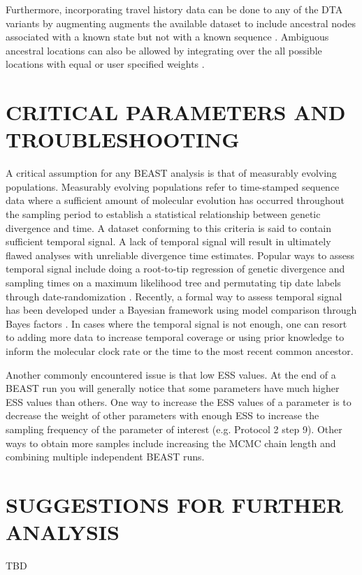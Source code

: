 \documentclass{article}
\begin{document}
\begin{multicols}{2}
Furthermore, incorporating travel history data can be done to any of the DTA variants by augmenting augments the available dataset to include ancestral nodes associated with a known state but not with a known sequence \cite{travhist}. Ambiguous ancestral locations can also be allowed by integrating over the all possible locations with equal or user specified weights \cite{ambig}.

\section*{CRITICAL PARAMETERS AND TROUBLESHOOTING}
A critical assumption for any BEAST analysis is that of measurably evolving populations. Measurably evolving populations \cite{mep1,mep2} refer to time-stamped sequence data where a sufficient amount of molecular evolution has occurred throughout the sampling period to establish a statistical relationship between genetic divergence and time. A dataset conforming to this criteria is said to contain sufficient temporal signal. A lack of temporal signal will result in ultimately flawed analyses with unreliable divergence time estimates. Popular ways to assess temporal signal include doing a root-to-tip regression of genetic divergence and sampling times on a maximum likelihood tree \cite{tempest} and permutating tip date labels through date-randomization \cite{tipdate}. Recently, a formal way to assess temporal signal has been developed under a Bayesian framework using model comparison through Bayes factors \cite{bets}. In cases where the temporal signal is not enough, one can resort to adding more data to increase temporal coverage or using prior knowledge to inform the molecular clock rate or the time to the most recent common ancestor.

Another commonly encountered issue is that low ESS values. At the end of a BEAST run you will generally notice that some parameters have much higher ESS values than others. One way to increase the ESS values of a parameter is to decrease the weight of other parameters with enough ESS to increase the sampling frequency of the parameter of interest (e.g. Protocol 2 step 9). Other ways to obtain more samples include increasing the MCMC chain length and combining multiple independent BEAST runs.

\section*{SUGGESTIONS FOR FURTHER ANALYSIS}

TBD




\end{multicols}
\end{document}
